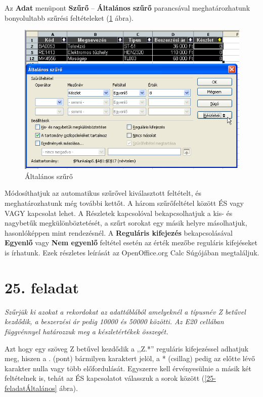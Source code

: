 Az \textbf{Adat} menüpont \textbf{Szűrő} --
\textbf{Általános} \textbf{szűrő} parancsával
meghatározhatunk bonyolultabb szűrési feltételeket (\ref{ÁltalánosSzűrő}
ábra).

\begin{figure}[!h]
\begin{center}
\includegraphics[width=13.743cm]{oocalcv1-img115.png}
\caption{Általános szűrő}\label{ÁltalánosSzűrő}
\end{center}
\end{figure}

Módosíthatjuk az automatikus szűrővel kiválasztott
feltételt, és meghatározhatunk még további kettőt. A
három szűrőfeltétel között ÉS vagy VAGY kapcsolat
lehet. A Részletek kapcsolóval bekapcsolhatjuk a kis- és
nagybetűk megkülönböztetését, a szűrt sorokat egy
másik helyre másolhatjuk, hasonlóképpen mint rendezésnél. A
\textbf{Reguláris kifejezés} bekapcsolásával
\textbf{Egyenlő} vagy \textbf{Nem egyenlő} feltétel esetén
az érték mezőbe reguláris kifejéseket is írhatunk. Ezek
részletes leírását az OpenOffice.org Calc Súgójában
megtaláljuk.


\section{25. feladat}

{\itshape
Szűrjük ki azokat a rekordokat az adattáblából amelyeknél
a típusnév Z betűvel kezdődik, a beszerzési ár pedig
10000 és 50000 közötti. Az E20 cellában függvénnyel
határozzuk meg a készletértékek összegét.}

Azt hogy egy szöveg Z betűvel kezdődik a
,,Z.*'' reguláris kifejezéssel
adhatjuk meg, hiszen a . (pont) bármilyen karaktert jelöl, a *
(csillag) pedig az előtte lévő karakter nulla vagy több
előfordulását. Egyszerre kell érvényesülnie a másik
két feltételnek is, tehát az ÉS kapcsolatot válasszuk a sorok
között (\ref{25-feladatÁltalános} ábra).

